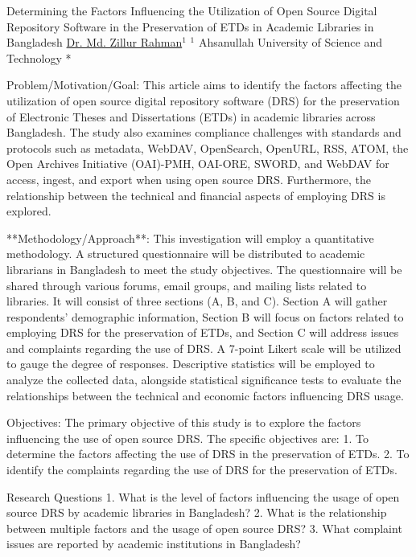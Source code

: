 
    \begin{abstract_online}{Determining the Factors Influencing the Utilization of Open Source Digital Repository Software in the Preservation of ETDs in Academic Libraries in Bangladesh}{%
    \underline{Dr. Md. Zillur Rahman}$^{1}$}{%
    }{%
    $^1$ Ahsanullah University of Science and Technology *\newline{}
}

Problem/Motivation/Goal: This article aims to identify the factors affecting the utilization of open source digital repository software (DRS) for the preservation of Electronic Theses and Dissertations (ETDs) in academic libraries across Bangladesh. The study also examines compliance challenges with standards and protocols such as metadata, WebDAV, OpenSearch, OpenURL, RSS, ATOM, the Open Archives Initiative (OAI)-PMH, OAI-ORE, SWORD, and WebDAV for access, ingest, and export when using open source DRS. Furthermore, the relationship between the technical and financial aspects of employing DRS is explored.

**Methodology/Approach**: This investigation will employ a quantitative methodology. A structured questionnaire will be distributed to academic librarians in Bangladesh to meet the study objectives. The questionnaire will be shared through various forums, email groups, and mailing lists related to libraries. It will consist of three sections (A, B, and C). Section A will gather respondents' demographic information, Section B will focus on factors related to employing DRS for the preservation of ETDs, and Section C will address issues and complaints regarding the use of DRS. A 7-point Likert scale will be utilized to gauge the degree of responses. Descriptive statistics will be employed to analyze the collected data, alongside statistical significance tests to evaluate the relationships between the technical and economic factors influencing DRS usage.

Objectives: The primary objective of this study is to explore the factors influencing the use of open source DRS. The specific objectives are:
1. To determine the factors affecting the use of DRS in the preservation of ETDs.
2. To identify the complaints regarding the use of DRS for the preservation of ETDs.

Research Questions
1. What is the level of factors influencing the usage of open source DRS by academic libraries in Bangladesh?
2. What is the relationship between multiple factors and the usage of open source DRS?
3. What complaint issues are reported by academic institutions in Bangladesh?


\end{abstract_online}

